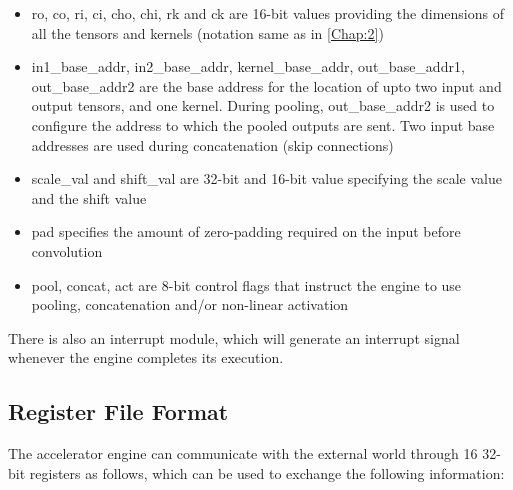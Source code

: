 \documentclass[a4paper,12pt, final]{report}
\begin{document}
\begin{itemize}
	\item ro, co, ri, ci, cho, chi, rk and ck are 16-bit values providing the dimensions of all the tensors and kernels (notation same as in \ref{Chap:2})
	\item in1\_base\_addr, in2\_base\_addr, kernel\_base\_addr, out\_base\_addr1, out\_base\_addr2 are the base address for the location of upto two input and output tensors, and one kernel. During pooling, out\_base\_addr2 is used to configure the address to which the pooled outputs are sent. Two input base addresses are used during concatenation (skip connections)
	\item scale\_val and shift\_val are 32-bit and 16-bit value specifying the scale value and the shift value
	\item pad specifies the amount of zero-padding required on the input before convolution
	\item pool, concat, act are 8-bit control flags that instruct the engine to use pooling, concatenation and/or non-linear activation
\end{itemize}

There is also an interrupt module, which will generate an interrupt signal whenever the engine completes its execution.

\subsection{Register File Format}


The accelerator engine can communicate with the external world through 16 32-bit registers as follows, which can be used to exchange the following information:
\end{document}
